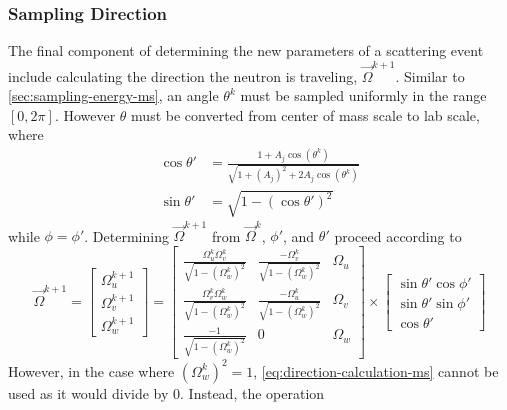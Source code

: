 \subsubsection{Sampling Direction}
The final component of determining the new parameters of a scattering event include calculating the direction the neutron is traveling, $\overrightarrow{\Omega}^{k+1}$. Similar to \autoref{sec:sampling-energy-ms}, an angle $\theta^k$ must be sampled uniformly in the range $[0,2\pi]$. However $\theta$ must be converted from center of mass scale to lab scale, where
\begin{align}
    \cos{\theta'} &= \frac{1 + A_j \cos{\left( \theta^k \right)}}{\sqrt{1 + \left( A_j\right)^2 + 2A_j\cos{\left(\theta^k \right)}}} \\
    \sin{\theta'} &= \sqrt{1 - \left( \cos{\theta'} \right)^2}
\end{align}
while $\phi=\phi'$.
Determining $\overrightarrow{\Omega}^{k+1}$ from $\overrightarrow{\Omega}^{k}$, $\phi'$, and $\theta'$ proceed according to
\begin{equation}
    \label{eq:direction-calculation-ms}
    \overrightarrow{\Omega}^{k+1} = \begin{bmatrix}
        \Omega^{k+1}_u \\[8pt]
        \Omega^{k+1}_v \\[8pt]
        \Omega^{k+1}_w
    \end{bmatrix}
    = \begin{bmatrix}
        \frac{\Omega_{u}^{k} \Omega_{v}^{k}} { \sqrt{1 - \left(\Omega_{w}^{k}\right)^2 }} &
        \frac{-\Omega_v^k} { \sqrt{1 - \left(\Omega_{w}^{k}\right)^2 }} &
        \Omega_u \\[10pt]
        \frac{\Omega_{v}^{k} \Omega_{w}^{k}} { \sqrt{1 - \left(\Omega_{w}^{k}\right)^2 }} &
        \frac{-\Omega_u^k} { \sqrt{1 - \left(\Omega_{w}^{k}\right)^2 }} &
        \Omega_v \\[10pt]
        \frac{-1} { \sqrt{1 - \left(\Omega_{w}^{k}\right)^2 }} &
        0 &
        \Omega_w
    \end{bmatrix} \times
    \begin{bmatrix}
        \sin{\theta'}\cos{\phi'} \\[8pt]
        \sin{\theta'}\sin{\phi'} \\[8pt]
        \cos{\theta'}
    \end{bmatrix}
\end{equation}
However, in the case where $\left(\Omega_w^k\right)^2 = 1$, \autoref{eq:direction-calculation-ms} cannot be used as it would divide by 0. Instead, the operation
